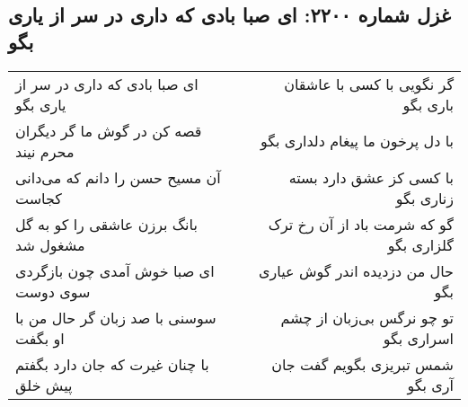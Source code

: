 \begin{center}
\section*{غزل شماره ۲۲۰۰: ای صبا بادی که داری در سر از یاری بگو}
\label{sec:2200}
\begin{longtable}{l p{0.5cm} r}
ای صبا بادی که داری در سر از یاری بگو
&&
گر نگویی با کسی با عاشقان باری بگو
\\
قصه کن در گوش ما گر دیگران محرم نیند
&&
با دل پرخون ما پیغام دلداری بگو
\\
آن مسیح حسن را دانم که می‌دانی کجاست
&&
با کسی کز عشق دارد بسته زناری بگو
\\
بانگ برزن عاشقی را کو به گل مشغول شد
&&
گو که شرمت باد از آن رخ ترک گلزاری بگو
\\
ای صبا خوش آمدی چون بازگردی سوی دوست
&&
حال من دزدیده اندر گوش عیاری بگو
\\
سوسنی با صد زبان گر حال من با او بگفت
&&
تو چو نرگس بی‌زبان از چشم اسراری بگو
\\
با چنان غیرت که جان دارد بگفتم پیش خلق
&&
شمس تبریزی بگویم گفت جان آری بگو
\\
\end{longtable}
\end{center}
